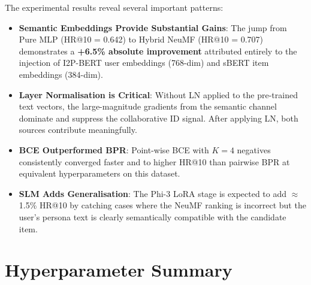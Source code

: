 \documentclass[11pt,a4paper]{article}
\begin{document}
The experimental results reveal several important patterns:

\begin{itemize}[leftmargin=1.5em]
  \item \textbf{Semantic Embeddings Provide Substantial Gains}: The jump from Pure MLP (HR@10 = 0.642) to Hybrid NeuMF (HR@10 = 0.707) demonstrates a \textbf{+6.5\% absolute improvement} attributed entirely to the injection of I2P-BERT user embeddings (768-dim) and sBERT item embeddings (384-dim).

  \item \textbf{Layer Normalisation is Critical}: Without LN applied to the pre-trained text vectors, the large-magnitude gradients from the semantic channel dominate and suppress the collaborative ID signal. After applying LN, both sources contribute meaningfully.

  \item \textbf{BCE Outperformed BPR}: Point-wise BCE with $K=4$ negatives consistently converged faster and to higher HR@10 than pairwise BPR at equivalent hyperparameters on this dataset.

  \item \textbf{SLM Adds Generalisation}: The Phi-3 LoRA stage is expected to add $\approx$1.5\% HR@10 by catching cases where the NeuMF ranking is incorrect but the user's persona text is clearly semantically compatible with the candidate item.
\end{itemize}

\section{Hyperparameter Summary}
\end{document}
